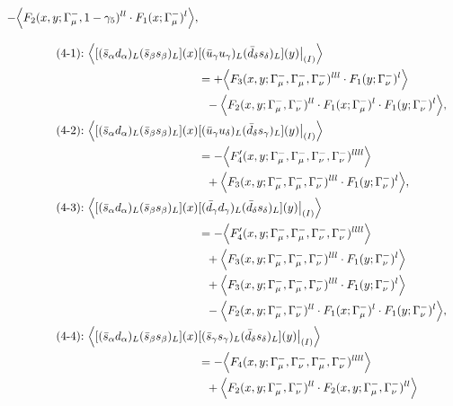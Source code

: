 \begin{align}
 - \Big\langle F_2(x,y;\Gamma_\mu^-,1-\gamma_5)^{ll} \cdot F_1(x;\Gamma_\mu^-)^l\Big\rangle,
\\[3mm]
\mbox{(4-1):}\ 
\Big\langle
[(\bar s_\alpha d_\alpha)_L(\bar s_\beta s_\beta)_L](x)&
[(\bar u_\gamma u_\gamma)_L(\bar d_\delta s_\delta)_L](y)\big|_{(I)}
\Big\rangle
\notag\\*
&=
 + \Big\langle F_3(x,y;\Gamma_\mu^-,\Gamma_\mu^-,\Gamma_\nu^-)^{lll} \cdot F_1(y;\Gamma_\nu^-)^l\Big\rangle
\notag\\*&\ \ 
 - \Big\langle F_2(x,y;\Gamma_\mu^-,\Gamma_\nu^-)^{ll} \cdot F_1(x;\Gamma_\mu^-)^l \cdot F_1(y;\Gamma_\nu^-)^l\Big\rangle,
\\
\mbox{(4-2):}\ 
\Big\langle
[(\bar s_\alpha d_\alpha)_L(\bar s_\beta s_\beta)_L](x)&
[(\bar u_\gamma u_\delta)_L(\bar d_\delta s_\gamma)_L](y)\big|_{(I)}
\Big\rangle
\notag\\*
&=
 - \Big\langle F_4'(x,y;\Gamma_\mu^-,\Gamma_\mu^-,\Gamma_\nu^-,\Gamma_\nu^-)^{llll}\Big\rangle
\notag\\*&\ \ 
 + \Big\langle F_3(x,y;\Gamma_\mu^-,\Gamma_\mu^-,\Gamma_\nu^-)^{lll} \cdot F_1(y;\Gamma_\nu^-)^l\Big\rangle,
\\
\mbox{(4-3):}\ 
\Big\langle
[(\bar s_\alpha d_\alpha)_L(\bar s_\beta s_\beta)_L](x)&
[(\bar d_\gamma d_\gamma)_L(\bar d_\delta s_\delta)_L](y)\big|_{(I)}
\Big\rangle
\notag\\*
&=
 - \Big\langle F_4'(x,y;\Gamma_\mu^-,\Gamma_\mu^-,\Gamma_\nu^-,\Gamma_\nu^-)^{llll}\Big\rangle
\notag\\*&\ \ 
 + \Big\langle F_3(x,y;\Gamma_\mu^-,\Gamma_\mu^-,\Gamma_\nu^-)^{lll} \cdot F_1(y;\Gamma_\nu^-)^l\Big\rangle
\notag\\*&\ \ 
 + \Big\langle F_3(x,y;\Gamma_\mu^-,\Gamma_\mu^-,\Gamma_\nu^-)^{lll} \cdot F_1(y;\Gamma_\nu^-)^l\Big\rangle
\notag\\*&\ \ 
 - \Big\langle F_2(x,y;\Gamma_\mu^-,\Gamma_\nu^-)^{ll} \cdot F_1(x;\Gamma_\mu^-)^l \cdot F_1(y;\Gamma_\nu^-)^l\Big\rangle,
\\
\mbox{(4-4):}\ 
\Big\langle
[(\bar s_\alpha d_\alpha)_L(\bar s_\beta s_\beta)_L](x)&
[(\bar s_\gamma s_\gamma)_L(\bar d_\delta s_\delta)_L](y)\big|_{(I)}
\Big\rangle
\notag\\*
&=
 - \Big\langle F_4(x,y;\Gamma_\mu^-,\Gamma_\nu^-,\Gamma_\mu^-,\Gamma_\nu^-)^{llll}\Big\rangle
\notag\\*&\ \ 
 + \Big\langle F_2(x,y;\Gamma_\mu^-,\Gamma_\nu^-)^{ll} \cdot F_2(x,y;\Gamma_\mu^-,\Gamma_\nu^-)^{ll}\Big\rangle
\notag\\*&\ \ 

\end{align}
